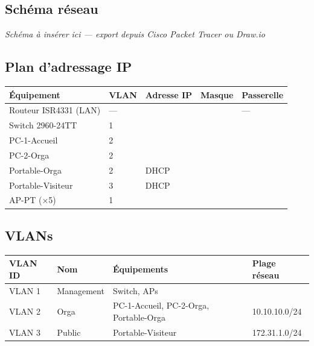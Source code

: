 \documentclass[a4paper,12pt]{article}
\begin{document}
\subsection{Schéma réseau}


\begin{infobox}
  \textit{Schéma à insérer ici — export depuis Cisco Packet Tracer ou Draw.io}
\end{infobox}

\subsection{Plan d'adressage IP}

\begin{tabularx}{\textwidth}{L{3.5cm} C{2.5cm} C{2.5cm} C{2.5cm} L{3cm}}
  \toprule
  \textbf{Équipement} & \textbf{VLAN} & \textbf{Adresse IP} & \textbf{Masque} & \textbf{Passerelle} \\
  \midrule
  Routeur ISR4331 (LAN) & — & & & — \\
  Switch 2960-24TT & 1 & & & \\
  PC-1-Accueil & 2 & & & \\
  PC-2-Orga & 2 & & & \\
  Portable-Orga & 2 & DHCP & & \\
  Portable-Visiteur & 3 & DHCP & & \\
  AP-PT (×5) & 1 & & & \\
  \bottomrule
\end{tabularx}

\subsection{VLANs}

\begin{tabularx}{\textwidth}{C{2cm} C{3cm} X C{3.5cm}}
  \toprule
  \textbf{VLAN ID} & \textbf{Nom} & \textbf{Équipements} & \textbf{Plage réseau} \\
  \midrule
  VLAN 1 & Management & Switch, APs & \\
  VLAN 2 & Orga & PC-1-Accueil, PC-2-Orga, Portable-Orga & 10.10.10.0/24 \\
  VLAN 3 & Public & Portable-Visiteur & 172.31.1.0/24 \\
  \bottomrule
\end{tabularx}
\end{document}

